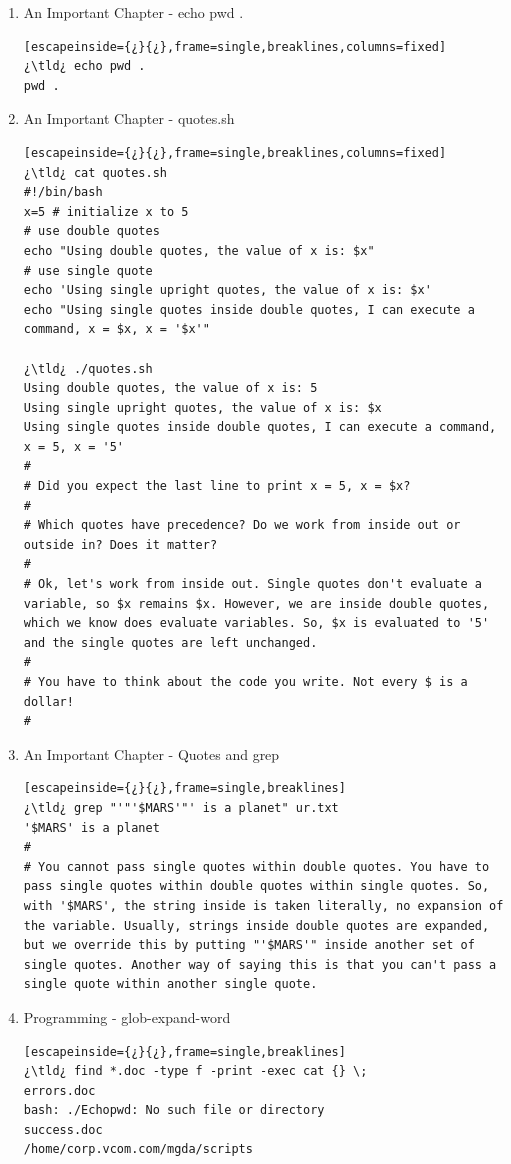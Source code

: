 \begin{enumerate}

\item\hypertarget{echopwd.}{An Important Chapter - echo pwd .}
\begin{lstlisting}[escapeinside={¿}{¿},frame=single,breaklines,columns=fixed]
¿\tld¿ echo pwd .
pwd .	
\end{lstlisting}	
	
\item\hypertarget{quotes.sh}{An Important Chapter - quotes.sh}
\begin{lstlisting}[escapeinside={¿}{¿},frame=single,breaklines,columns=fixed]
¿\tld¿ cat quotes.sh
#!/bin/bash
x=5 # initialize x to 5
# use double quotes
echo "Using double quotes, the value of x is: $x"
# use single quote
echo 'Using single upright quotes, the value of x is: $x'
echo "Using single quotes inside double quotes, I can execute a command, x = $x, x = '$x'"

¿\tld¿ ./quotes.sh
Using double quotes, the value of x is: 5
Using single upright quotes, the value of x is: $x
Using single quotes inside double quotes, I can execute a command, x = 5, x = '5'
#
# Did you expect the last line to print x = 5, x = $x?
#
# Which quotes have precedence? Do we work from inside out or outside in? Does it matter?
#
# Ok, let's work from inside out. Single quotes don't evaluate a variable, so $x remains $x. However, we are inside double quotes, which we know does evaluate variables. So, $x is evaluated to '5' and the single quotes are left unchanged.
#
# You have to think about the code you write. Not every $ is a dollar!
#	
\end{lstlisting}

\item\hypertarget{singlequote}{An Important Chapter - Quotes and grep}
\begin{lstlisting}[escapeinside={¿}{¿},frame=single,breaklines]
¿\tld¿ grep "'"'$MARS'"' is a planet" ur.txt
'$MARS' is a planet
#
# You cannot pass single quotes within double quotes. You have to pass single quotes within double quotes within single quotes. So, with '$MARS', the string inside is taken literally, no expansion of the variable. Usually, strings inside double quotes are expanded, but we override this by putting "'$MARS'" inside another set of single quotes. Another way of saying this is that you can't pass a single quote within another single quote.
\end{lstlisting}

\item\hypertarget{catfileheaders}{Programming - glob-expand-word}
\begin{lstlisting}[escapeinside={¿}{¿},frame=single,breaklines]
¿\tld¿ find *.doc -type f -print -exec cat {} \;
errors.doc
bash: ./Echopwd: No such file or directory
success.doc
/home/corp.vcom.com/mgda/scripts
\end{lstlisting}


\end{enumerate}
